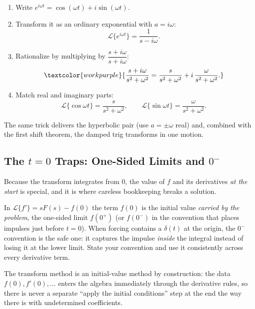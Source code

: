 \begin{methodbox}
\begin{enumerate}
    \item Write $e^{i\omega t} = \cos(\omega t) + i\sin(\omega t)$.
    \item Transform it as an ordinary exponential with $a = i\omega$:
          \[ \mathcal{L}\{e^{i\omega t}\} = \frac{1}{s - i\omega}. \]
    \item Rationalize by multiplying by $\dfrac{s+i\omega}{s+i\omega}$:
          \[ \textcolor{workpurple}{\frac{s+i\omega}{s^2+\omega^2}
             = \frac{s}{s^2+\omega^2} + i\,\frac{\omega}{s^2+\omega^2}.} \]
    \item Match real and imaginary parts:
          \[ \mathcal{L}\{\cos\omega t\} = \frac{s}{s^2+\omega^2}, \qquad
             \mathcal{L}\{\sin\omega t\} = \frac{\omega}{s^2+\omega^2}. \]
\end{enumerate}
\end{methodbox}

The same trick delivers the hyperbolic pair (use $a=\pm\omega$ real) and, combined
with the first shift theorem, the damped trig transforms in one motion.

\subsection{The $t=0$ Traps: One-Sided Limits and $0^-$}

Because the transform integrates from $0$, the value of $f$ and its derivatives
\emph{at the start} is special, and it is where careless bookkeeping breaks a
solution.

\begin{warningbox}
In $\mathcal{L}\{f'\} = sF(s) - f(0)$ the term $f(0)$ is the initial value
\emph{carried by the problem}, the one-sided limit $f(0^+)$ (or $f(0^-)$ in the
convention that places impulses just before $t=0$). When forcing contains a
$\delta(t)$ at the origin, the $0^-$ convention is the safe one: it captures the
impulse \emph{inside} the integral instead of losing it at the lower limit. State
your convention and use it consistently across every derivative term.
\end{warningbox}

\begin{conceptbox}
The transform method is an \textcolor{accentorange}{initial-value} method by
construction: the data $f(0), f'(0), \dots$ enters the algebra immediately through
the derivative rules, so there is never a separate ``apply the initial conditions''
step at the end the way there is with undetermined coefficients.
\end{conceptbox}

